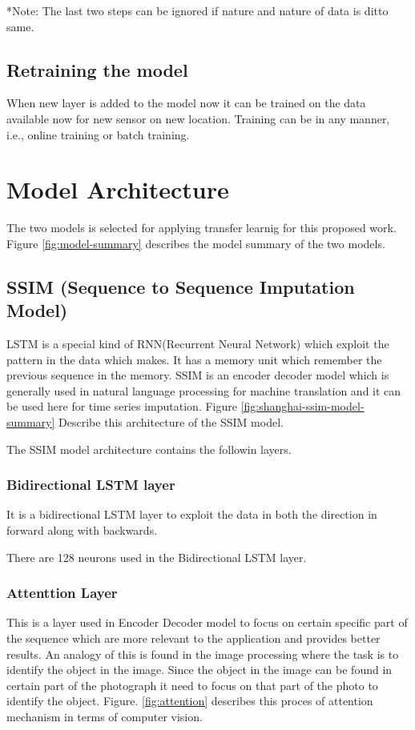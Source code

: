 *Note: The last two steps can be ignored if nature and nature of data is ditto same.

\subsection{Retraining the model}
When new layer is added to the model now it can be trained on the data available now for new sensor on new location. Training can be in any manner, i.e., online training or batch training.

\section{Model Architecture}

The two models is selected for applying transfer learnig for this proposed work. Figure \ref{fig:model-summary} describes the model summary of the two models.

\subsection{SSIM (Sequence to Sequence Imputation Model)}

	LSTM is a special kind of RNN(Recurrent Neural Network) which exploit the pattern in the data which makes. It has a memory unit which remember the previous sequence in the memory.
	SSIM is an encoder decoder model which is generally used in natural language processing for machine translation and it can be used here for time series imputation. Figure \ref{fig:shanghai-ssim-model-summary} Describe this architecture of the SSIM model.

	The SSIM model architecture contains the followin layers.
	\subsubsection{Bidirectional LSTM layer}
	It is a bidirectional LSTM layer to exploit the data in both the direction in forward along with backwards. 

	There are 128 neurons used in the Bidirectional LSTM layer.

	\subsubsection{Attenttion Layer}
	This is a layer used in Encoder Decoder model to focus on certain specific part of the sequence which are more relevant to the application and provides better results.
	An analogy of this is found in the image processing where the task is to identify the object in the image. Since the object in the image can be found in certain part of the photograph it need to focus on that part of the photo to identify the object. Figure. \ref{fig:attention} describes this proces of attention mechanism in terms of computer vision.

